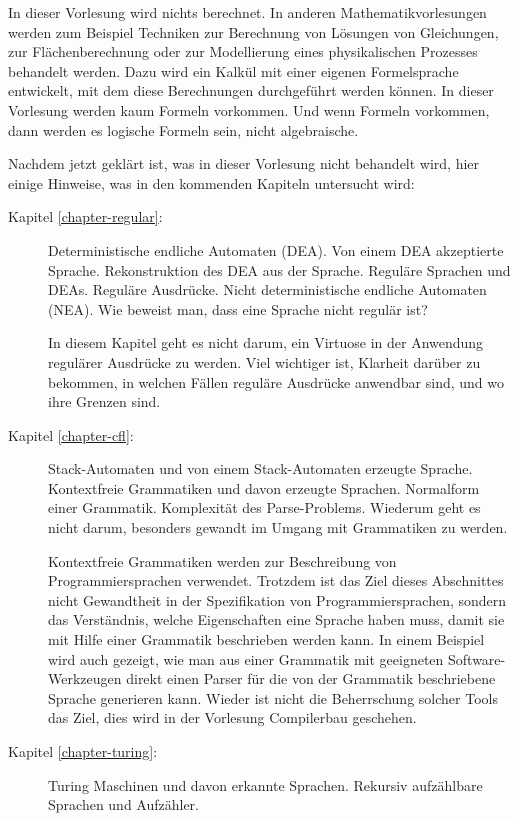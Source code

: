 In dieser Vorlesung wird nichts berechnet.
In anderen
Mathematikvorlesungen werden zum Beispiel Techniken zur Berechnung
von Lösungen von
Gleichungen, zur Flächenberechnung oder zur Modellierung eines 
physikalischen Prozesses behandelt werden.
Dazu wird ein Kalkül mit einer eigenen Formelsprache entwickelt,
mit dem diese Berechnungen durchgeführt werden können.
In dieser Vorlesung werden kaum Formeln vorkommen. 
Und wenn Formeln vorkommen, dann werden es logische Formeln sein,
nicht algebraische.

Nachdem jetzt geklärt ist, was in dieser Vorlesung nicht behandelt
wird, hier einige Hinweise, was in den kommenden Kapiteln untersucht
wird:
\begin{description}
\item[Kapitel \ref{chapter-regular}:] Deterministische endliche Automaten (DEA). Von einem
DEA akzeptierte Sprache. Rekonstruktion des DEA aus der Sprache.
Reguläre Sprachen und DEAs. Reguläre Ausdrücke. Nicht deterministische
endliche Automaten (NEA). Wie beweist man, dass eine Sprache nicht regulär
ist?

In diesem Kapitel geht es nicht darum, ein Virtuose in der
Anwendung regulärer Ausdrücke zu werden. Viel wichtiger ist, Klarheit darüber
zu bekommen, in welchen Fällen reguläre Ausdrücke anwendbar sind,
und wo ihre Grenzen sind.

\item[Kapitel \ref{chapter-cfl}:] Stack-Automaten und von einem Stack-Automaten
erzeugte Sprache. Kontextfreie Grammatiken und davon erzeugte Sprachen. 
Normalform einer Grammatik. Komplexität des Parse-Problems.
Wiederum geht es nicht darum, besonders gewandt im Umgang mit Grammatiken
zu werden.

Kontextfreie Grammatiken werden zur Beschreibung von Programmiersprachen verwendet.
Trotzdem ist das Ziel dieses Abschnittes nicht Gewandtheit in der Spezifikation
von Programmiersprachen, sondern das Verständnis, welche Eigenschaften eine
Sprache haben muss, damit sie mit Hilfe einer Grammatik beschrieben werden kann.
In einem Beispiel wird auch gezeigt, wie man aus einer Grammatik mit geeigneten
Software-Werkzeugen direkt einen Parser für die von der Grammatik beschriebene
Sprache generieren kann. Wieder ist nicht die Beherrschung solcher Tools das
Ziel, dies wird in der Vorlesung Compilerbau geschehen.

\item[Kapitel \ref{chapter-turing}:] Turing Maschinen und davon erkannte Sprachen. 
Rekursiv aufzählbare Sprachen und Aufzähler.


\end{description}
